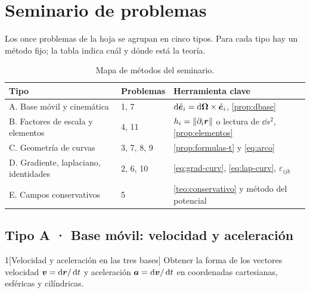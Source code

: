 \section{Seminario de problemas}
\label{sec:seminario}

Los once problemas de la hoja se agrupan en cinco tipos. Para cada tipo hay
un método fijo; la tabla indica cuál y dónde está la teoría.

\begin{table}[ht]
\centering
\caption{Mapa de métodos del seminario.}
\label{tab:mapa}
\small
\begin{tabular}{@{}l l l@{}}
\toprule
\color{cian}Tipo & \color{cian}Problemas & \color{cian}Herramienta clave\\
\midrule
A. Base móvil y cinemática & 1, 7 & $\mathop{}\!\mathrm{d}\hat{\bm{e}}_{i}=\mathop{}\!\mathrm{d}\bm{\Omega}\times\hat{\bm{e}}_{i}$, \cref{prop:dbase}\\
B. Factores de escala y elementos & 4, 11 & $h_{i}=\left\lVert \partial_{i}\bm{r}\right\rVert$ o lectura de $\dd s^{2}$, \cref{prop:elementos}\\
C. Geometría de curvas & 3, 7, 8, 9 & \cref{prop:formulas-t} y \eqref{eq:arco}\\
D. Gradiente, laplaciano, identidades & 2, 6, 10 & \eqref{eq:grad-curv}, \eqref{eq:lap-curv}, $\varepsilon_{ijk}$\\
E. Campos conservativos & 5 & \cref{teo:conservativo} y método del potencial\\
\bottomrule
\end{tabular}
\end{table}

\subsection{Tipo A · Base móvil: velocidad y aceleración}

\begin{problema}{1}[Velocidad y aceleración en las tres bases]
\label{prob:1}
Obtener la forma de los vectores velocidad $\bm{v}=\mathop{}\!\mathrm{d}\bm{r}/\mathop{}\!\mathrm{d} t$ y
aceleración $\bm{a}=\mathop{}\!\mathrm{d}\bm{v}/\mathop{}\!\mathrm{d} t$ en coordenadas cartesianas, esféricas y
cilíndricas.
\end{problema}

